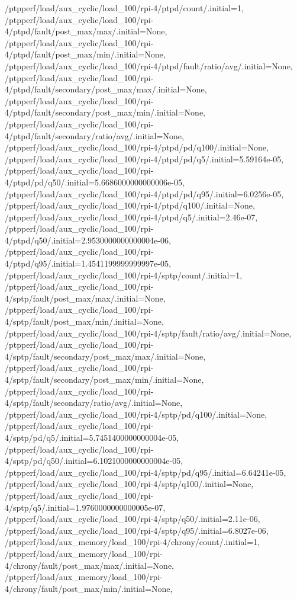 {    /ptpperf/load/aux_cyclic/load_100/rpi-4/ptpd/count/.initial=1,
    /ptpperf/load/aux_cyclic/load_100/rpi-4/ptpd/fault/post_max/max/.initial=None,
    /ptpperf/load/aux_cyclic/load_100/rpi-4/ptpd/fault/post_max/min/.initial=None,
    /ptpperf/load/aux_cyclic/load_100/rpi-4/ptpd/fault/ratio/avg/.initial=None,
    /ptpperf/load/aux_cyclic/load_100/rpi-4/ptpd/fault/secondary/post_max/max/.initial=None,
    /ptpperf/load/aux_cyclic/load_100/rpi-4/ptpd/fault/secondary/post_max/min/.initial=None,
    /ptpperf/load/aux_cyclic/load_100/rpi-4/ptpd/fault/secondary/ratio/avg/.initial=None,
    /ptpperf/load/aux_cyclic/load_100/rpi-4/ptpd/pd/q100/.initial=None,
    /ptpperf/load/aux_cyclic/load_100/rpi-4/ptpd/pd/q5/.initial=5.59164e-05,
    /ptpperf/load/aux_cyclic/load_100/rpi-4/ptpd/pd/q50/.initial=5.6686000000000006e-05,
    /ptpperf/load/aux_cyclic/load_100/rpi-4/ptpd/pd/q95/.initial=6.0256e-05,
    /ptpperf/load/aux_cyclic/load_100/rpi-4/ptpd/q100/.initial=None,
    /ptpperf/load/aux_cyclic/load_100/rpi-4/ptpd/q5/.initial=2.46e-07,
    /ptpperf/load/aux_cyclic/load_100/rpi-4/ptpd/q50/.initial=2.9530000000000004e-06,
    /ptpperf/load/aux_cyclic/load_100/rpi-4/ptpd/q95/.initial=1.4541199999999997e-05,
    /ptpperf/load/aux_cyclic/load_100/rpi-4/sptp/count/.initial=1,
    /ptpperf/load/aux_cyclic/load_100/rpi-4/sptp/fault/post_max/max/.initial=None,
    /ptpperf/load/aux_cyclic/load_100/rpi-4/sptp/fault/post_max/min/.initial=None,
    /ptpperf/load/aux_cyclic/load_100/rpi-4/sptp/fault/ratio/avg/.initial=None,
    /ptpperf/load/aux_cyclic/load_100/rpi-4/sptp/fault/secondary/post_max/max/.initial=None,
    /ptpperf/load/aux_cyclic/load_100/rpi-4/sptp/fault/secondary/post_max/min/.initial=None,
    /ptpperf/load/aux_cyclic/load_100/rpi-4/sptp/fault/secondary/ratio/avg/.initial=None,
    /ptpperf/load/aux_cyclic/load_100/rpi-4/sptp/pd/q100/.initial=None,
    /ptpperf/load/aux_cyclic/load_100/rpi-4/sptp/pd/q5/.initial=5.7451400000000004e-05,
    /ptpperf/load/aux_cyclic/load_100/rpi-4/sptp/pd/q50/.initial=6.1021000000000004e-05,
    /ptpperf/load/aux_cyclic/load_100/rpi-4/sptp/pd/q95/.initial=6.64241e-05,
    /ptpperf/load/aux_cyclic/load_100/rpi-4/sptp/q100/.initial=None,
    /ptpperf/load/aux_cyclic/load_100/rpi-4/sptp/q5/.initial=1.9760000000000005e-07,
    /ptpperf/load/aux_cyclic/load_100/rpi-4/sptp/q50/.initial=2.11e-06,
    /ptpperf/load/aux_cyclic/load_100/rpi-4/sptp/q95/.initial=6.8027e-06,
    /ptpperf/load/aux_memory/load_100/rpi-4/chrony/count/.initial=1,
    /ptpperf/load/aux_memory/load_100/rpi-4/chrony/fault/post_max/max/.initial=None,
    /ptpperf/load/aux_memory/load_100/rpi-4/chrony/fault/post_max/min/.initial=None,
}
